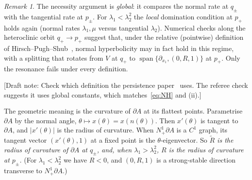 \documentclass[11pt,a4paper]{article}
\newif\ifdraftnotes \draftnotestrue
\newcommand{\note}[1]{\ifdraftnotes{\color{BrickRed}\textsf{\footnotesize[Draft note: #1]}}\fi}
\theoremstyle{definition}
\theoremstyle{remark}
\newtheorem{remark}[theorem]{Remark}
\newcommand{\Nb}{N^1_+\partial A}
\DeclareMathOperator{\spn}{span}
\begin{document}
\begin{remark}
The necessity argument is \emph{global}: it compares the normal rate at $q_\pm$ with the tangential rate at $p_\pm$. For
$\lambda_1<\lambda_2^2$ the \emph{local} domination condition at $p_+$ holds again (normal rates $\lambda_1,\mu$ versus
tangential $\lambda_2$). Numerical checks along the heteroclinic orbit $q_+\to p_+$ suggest that, under the relative
(pointwise) definition of Hirsch--Pugh--Shub~\cite{HPS77}, normal hyperbolicity may in fact hold in this regime, with a
splitting that rotates from $V$ at $q_+$ to $\spn\{\partial_{x_1},(0,R,1)\}$ at $p_+$. Only the resonance fails under every
definition.
\end{remark}
\note{Check which definition the persistence paper~\cite{KLRTTT23} uses. The referee check suggests it uses global constants, which matches~\eqref{eq:NH} and (ii).}

The geometric meaning is the curvature of $\partial A$ at its flattest points. Parametrise $\partial A$ by the normal
angle, $\theta\mapsto x(\theta)=x(n(\theta))$. Then $x'(\theta)$ is tangent to $\partial A$, and $|x'(\theta)|$ is the
radius of curvature. When $\Nb$ is a $C^1$ graph, its tangent vector $(x'(\theta),1)$ at a fixed point is the
$\theta$-eigenvector. So \emph{$\tilde R$ is the radius of curvature of $\partial A$ at $q_\pm$, and, when
$\lambda_1>\lambda_2^2$, $R$ is the radius of curvature at $p_\pm$.} (For $\lambda_1<\lambda_2^2$ we have $R<0$, and $(0,R,1)$ is
a strong-stable direction transverse to $\Nb$.)
\end{document}
